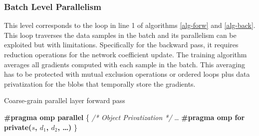 \subsubsection{Batch Level Parallelism}
This level corresponds to the loop in line 1 of algorithms \ref{alg-forw}
and \ref{alg-back}. 
This loop traverses the data samples in the batch and its parallelism 
can be exploited but with limitations. 
Specifically for the backward pass, it requires reduction operations 
for the network coefficient update. The training algorithm averages all 
gradients computed with each sample in the batch. This averaging
has to be protected with mutual exclusion operations or ordered
loops plus data privatization for the blobs that temporally store the
gradients. 



\begin{algorithm}
\small
\caption{Coarse-grain parallel layer forward pass}
\label{alg-par-forw}
\textbf{\#pragma omp parallel}
\{
\BlankLine
\emph{/* Object Privatization */}
\dots
\BlankLine
\textbf{\#pragma omp for private($s$, $d_1$, $d_2$, \dots)}
\BlankLine
{}
\}
\end{algorithm}

